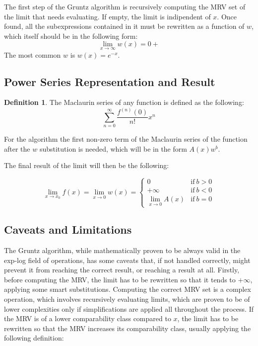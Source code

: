 \documentclass{article}
\theoremstyle{plain}
\theoremstyle{definition}
\newtheorem*{defn*}{Definition}
\theoremstyle{algorithm}
\begin{document}
	The first step of the Gruntz algorithm is recursively computing the MRV set of the limit that needs evaluating. If empty, the limit is indipendent of \(x\). 
	Once found, all the subexpressions contained in it must be rewritten as a function of \(w\), which itself should be in the following form: 
	\[
	\lim_{x \to \infty}{w(x)} = 0+
	\]
	The most common \(w\) is \(w(x) = e^{-x}\).
	
	\subsection{Power Series Representation and Result}
	
	\begin{defn*}
		The Maclaurin series of any function is defined as the following:
		\[
		\sum_{n=0}^{\infty}{\frac{f^{(n)}(0)}{n!} x^{n}} \tag{3} \label{eq:maclaurin}
		\] 
	\end{defn*}
	
	For the algorithm the first non-zero term of the Maclaurin series of the function after the \(w\) substitution is needed, which will be in the form \(A(x)w^b\).
	
	The final result of the limit will then be the following:
	
	\[
	\lim_{x \to x_{0}}{f(x)} = \lim_{x \to 0}{w(x)} = \begin{cases}
		0 &\text{if} \: b > 0 \\
		+\infty &\text{if} \: b < 0\\
		\lim_{x \to 0}{A(x)} &\text{if} \: b = 0
	\end{cases} \tag{4} \label{eq:result}
	\]
	
	\subsection{Caveats and Limitations}
	
	The Gruntz algorithm, while mathematically proven to be always valid in the exp-log field of operations, has some caveats that, if not handled correctly, might prevent it from reaching the correct result, or reaching a result at all. Firstly, before computing the MRV, the limit has to be rewritten so that it tends to \(+\infty\), applying some smart substitutions.
	Computing the correct MRV set is a complex operation, which involves recursively evaluating limits, which are proven to be of lower complexities only if simplifications are applied all throughout the process. If the MRV is of a lower comparability class compared to \({x}\), the limit has to be rewritten so that the MRV increases its comparability class, usually applying the following definition:
	
\end{document}
